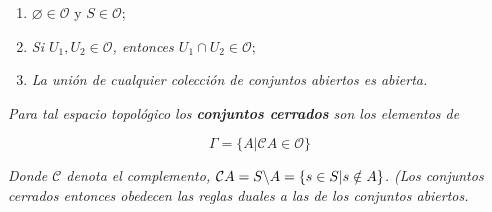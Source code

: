 \documentclass[a4paper,10pt]{article}
\numberwithin{equation}{section}
\begin{document}
\begin{enumerate}[label=(T{\arabic*})]
 \item $\varnothing \in \mathcal{O} \mathcal{}$ y $S \in \mathcal{O}$;
 \item \emph{Si $U_1,U_2 \in \mathcal{O}$, entonces $U_1 \cap U_2 \in \mathcal{O}$};
 \item \emph{La unión de cualquier colección de conjuntos abiertos es abierta.}
\end{enumerate}

\emph{Para tal espacio topológico los \textbf{conjuntos cerrados} son 
los elementos de}

$$
\Gamma = \{A | \mathcal{C} A \in \mathcal{O} \}
$$

\emph{Donde $\mathcal{C}$ denota el complemento, $\mathcal{C}A = S {\char`\\} A = \{s \in S | s \notin A\}$.
(Los conjuntos cerrados entonces obedecen las reglas duales a las de los conjuntos abiertos.}

\vspace{.3cm}
\end{document}
